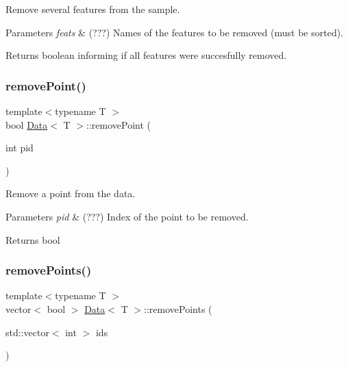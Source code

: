 Remove several features from the sample. 


\begin{DoxyParams}{Parameters}
{\em feats} & (???) Names of the features to be removed (must be sorted). \\
\hline
\end{DoxyParams}
\begin{DoxyReturn}{Returns}
boolean informing if all features were succesfully removed. 
\end{DoxyReturn}
\mbox{\label{class_data_a92ad77892fa46016d890d4ef4954ef2f}} 
\subsubsection{\texorpdfstring{remove\+Point()}{removePoint()}}
{\footnotesize\ttfamily template$<$typename T $>$ \\
bool \hyperlink{class_data}{Data}$<$ T $>$\+::remove\+Point (\begin{DoxyParamCaption}\item[{int}]{pid }\end{DoxyParamCaption})}



Remove a point from the data. 


\begin{DoxyParams}{Parameters}
{\em pid} & (???) Index of the point to be removed. \\
\hline
\end{DoxyParams}
\begin{DoxyReturn}{Returns}
bool 
\end{DoxyReturn}
\mbox{\label{class_data_ae5a3ca86bedc35bef909aac993439827}} 
\subsubsection{\texorpdfstring{remove\+Points()}{removePoints()}}
{\footnotesize\ttfamily template$<$typename T $>$ \\
vector$<$ bool $>$ \hyperlink{class_data}{Data}$<$ T $>$\+::remove\+Points (\begin{DoxyParamCaption}\item[{std\+::vector$<$ int $>$}]{ids }\end{DoxyParamCaption})}



